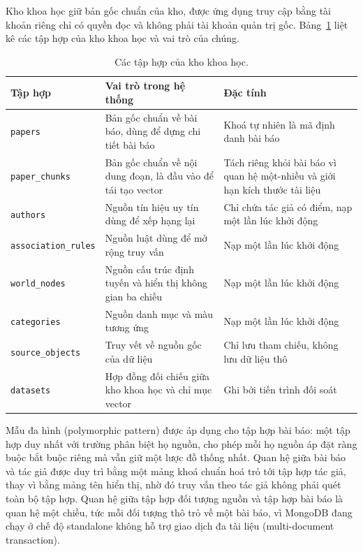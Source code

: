 Kho khoa học giữ bản gốc chuẩn của kho, được ứng dụng truy cập bằng tài khoản riêng chỉ có quyền đọc và không phải tài khoản quản trị gốc. Bảng~\ref{tab:tap-hop-kho-khoa-hoc} liệt kê các tập hợp của kho khoa học và vai trò của chúng.

\begin{table}[htbp]
    \centering
    \caption{Các tập hợp của kho khoa học.}
    \label{tab:tap-hop-kho-khoa-hoc}
    \small
    \begin{tabularx}{\textwidth}{@{}>{\raggedright\arraybackslash}p{3.6cm}>{\raggedright\arraybackslash}X>{\raggedright\arraybackslash}p{4.7cm}@{}}
        \toprule
        \textbf{Tập hợp} & \textbf{Vai trò trong hệ thống} & \textbf{Đặc tính} \\
        \midrule
        \texttt{papers} & Bản gốc chuẩn về bài báo, dùng để dựng chi tiết bài báo & Khoá tự nhiên là mã định danh bài báo \\
        \texttt{paper\_chunks} & Bản gốc chuẩn về nội dung đoạn, là đầu vào để tái tạo vector & Tách riêng khỏi bài báo vì quan hệ một-nhiều và giới hạn kích thước tài liệu \\
        \texttt{authors} & Nguồn tín hiệu uy tín dùng để xếp hạng lại & Chỉ chứa tác giả có điểm, nạp một lần lúc khởi động \\
        \texttt{association\_rules} & Nguồn luật dùng để mở rộng truy vấn & Nạp một lần lúc khởi động \\
        \texttt{world\_nodes} & Nguồn cấu trúc định tuyến và hiển thị không gian ba chiều & Nạp một lần lúc khởi động \\
        \texttt{categories} & Nguồn danh mục và màu tương ứng & Nạp một lần lúc khởi động \\
        \texttt{source\_objects} & Truy vết về nguồn gốc của dữ liệu & Chỉ lưu tham chiếu, không lưu dữ liệu thô \\
        \texttt{datasets} & Hợp đồng đối chiếu giữa kho khoa học và chỉ mục vector & Ghi bởi tiến trình đối soát \\
        \bottomrule
    \end{tabularx}
\end{table}

Mẫu đa hình (polymorphic pattern) được áp dụng cho tập hợp bài báo: một tập hợp duy nhất với trường phân biệt họ nguồn, cho phép mỗi họ nguồn áp đặt ràng buộc bắt buộc riêng mà vẫn giữ một lược đồ thống nhất. Quan hệ giữa bài báo và tác giả được duy trì bằng một mảng khoá chuẩn hoá trỏ tới tập hợp tác giả, thay vì bằng mảng tên hiển thị, nhờ đó truy vấn theo tác giả không phải quét toàn bộ tập hợp. Quan hệ giữa tập hợp đối tượng nguồn và tập hợp bài báo là quan hệ một chiều, tức mỗi đối tượng thô trỏ về một bài báo, vì MongoDB đang chạy ở chế độ standalone không hỗ trợ giao dịch đa tài liệu (multi-document transaction).

